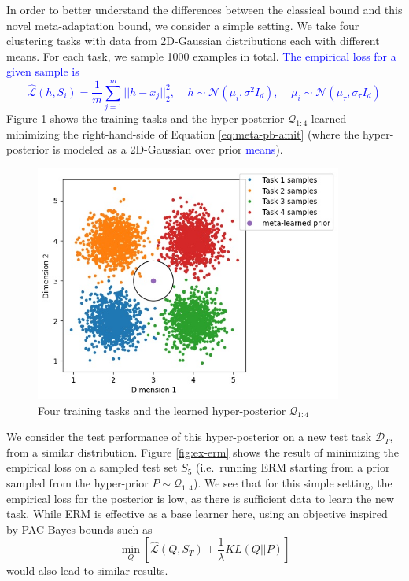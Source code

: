 \documentclass{article}
\theoremstyle{definition}
\newcommand{\LFe}[1]{\textcolor{blue}{#1}}
\begin{document}
In order to better understand the differences between the classical bound and this novel meta-adaptation bound, we consider a simple setting. We take four clustering tasks with data from 2D-Gaussian distributions each with different means. 
For each task, we sample 1000 examples in total.
\LFe{The empirical loss for a given sample is $$\hat{\mathcal{L}}(h,S_i)=\frac{1}{m}\sum_{j=1}^{m}||h-x_j||_2^2, \;\;\;\; h\sim \mathcal{N}(\mu_i,\sigma^2 I_d), \;\;\;\; \mu_i\sim \mathcal{N}(\mu_\tau,\sigma_\tau I_d)$$}
Figure \ref{fig:ex-baseline} shows the training tasks and the hyper-posterior $\mathcal{Q}_{1:4}$ learned minimizing the right-hand-side of Equation \ref{eq:meta-pb-amit} (where the hyper-posterior is modeled as a 2D-Gaussian over prior \LFe{means}).

\begin{figure}
	\centering
	\includegraphics[width=0.9\textwidth]{toy_example_train.JPG}
	\caption{Four training tasks and the learned hyper-posterior $\mathcal{Q}_{1:4}$}
	\label{fig:ex-baseline}
\end{figure}

We consider the test performance of this hyper-posterior on a new test task $\mathcal{D}_T$, from a similar distribution.
 Figure \ref{fig:ex-erm} shows the result of minimizing the empirical loss on a sampled test set $S_5$ (i.e.\ running ERM starting from a prior sampled from the hyper-prior $P\sim \mathcal{Q}_{1:4}$). We see that for this simple setting, the empirical loss for the posterior is low, as there is sufficient data to learn the new task.
While ERM is effective as a base learner here, using an objective inspired by PAC-Bayes bounds such as $$\min_{Q}\left [\hat{\mathcal{L}}(Q, S_T) + \frac{1}{\lambda}KL(Q||P)\right ]$$ would also lead to similar results. 
\end{document}

